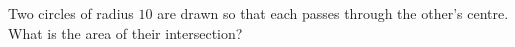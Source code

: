 Two circles of radius $10$ are drawn so that each passes through the other's centre. What is the area of their intersection?
